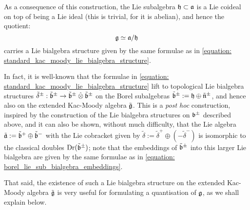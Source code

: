         As a consequence of this construction, the Lie subalgebra $\mathfrak{h} \subset \mathfrak{a}$ is a Lie coideal on top of being a Lie ideal (this is trivial, for it is abelian), and hence the quotient:
            $$\mathfrak{g} \simeq \mathfrak{a}/\mathfrak{h}$$
        carries a Lie bialgebra structure given by the same formulae as in \eqref{equation: standard_kac_moody_lie_bialgebra_structure}.
        \begin{remark}
            In fact, it is well-known that the formulae in \eqref{equation: standard_kac_moody_lie_bialgebra_structure} lift to topological Lie bialgebra structures $\tilde{\delta}^{\pm}: \tilde{\b}^{\pm} \to \tilde{\b}^{\pm} \hattensor \tilde{\b}^{\pm}$ on the Borel subalgebras $\tilde{\mathfrak{b}}^{\pm} := \mathfrak{h} \oplus \tilde{\mathfrak{n}}^{\pm}$, and hence also on the extended Kac-Moody algebra $\tilde{\mathfrak{g}}$. This is a \textit{post hoc} construction, inspired by the construction of the Lie bialgebra structures on $\mathfrak{b}^{\pm}$ described above, and it can also be shown, without much difficulty, that the Lie algebra $\tilde{\mathfrak{a}} := \tilde{\mathfrak{b}}^+ \oplus \tilde{\mathfrak{b}}^-$ with the Lie cobracket given by $\tilde{\delta} := \tilde{\delta}^+ \oplus (-\tilde{\delta}^-)$ is isomorphic to the classical doubles $\operatorname{Dr}(\tilde{\mathfrak{b}}^{\pm})$; note that the embeddings of $\tilde{\mathfrak{b}}^{\pm}$ into this larger Lie bialgebra are given by the same formulae as in \eqref{equation: borel_lie_sub_bialgebra_embeddings}. 

            That said, the existence of such a Lie bialgebra structure on the extended Kac-Moody algebra $\tilde{\mathfrak{g}}$ is very useful for formulating a quantisation of $\mathfrak{g}$, as we shall explain below. 
        \end{remark}

